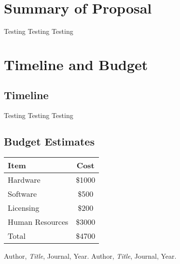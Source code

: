 \documentclass{report}
\begin{document}
\chapter{Summary of Proposal}
Testing Testing Testing

\chapter{Timeline and Budget}
\section{Timeline}
Testing Testing Testing
\section{Budget Estimates}
\begin{tabular}{|l|c|}
\hline
Item & Cost \\
\hline
Hardware & \$1000 \\
Software & \$500 \\
Licensing & \$200 \\
Human Resources & \$3000 \\
\hline
Total & \$4700 \\
\hline
\end{tabular}

\begin{thebibliography}{9}
 Author, \textit{Title}, Journal, Year.
 Author, \textit{Title}, Journal, Year.
\end{thebibliography}
\end{document}
